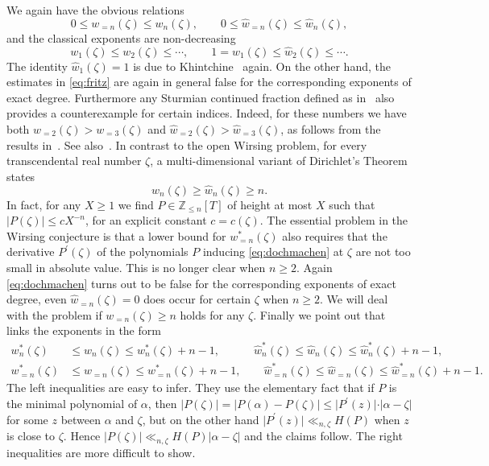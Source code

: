 \documentclass[12pt]{amsart}
\theoremstyle{definition}
\begin{document}
We again have the obvious relations
%
\begin{equation}  \label{eq:obvious}  
0\leq w_{=n}(\zeta)\leq w_{n}(\zeta), \qquad 0\leq \widehat{w}_{=n}(\zeta)\leq \widehat{w}_{n}(\zeta),   
\end{equation}
%
and the classical exponents are non-decreasing
%
\begin{equation} \label{eq:fritz}
w_{1}(\zeta)\leq w_{2}(\zeta)\leq \cdots, \qquad 1=\widehat{w}_{1}(\zeta)\leq \widehat{w}_{2}(\zeta)\leq \cdots.
\end{equation}
%
The identity $\widehat{w}_{1}(\zeta)=1$ is due
to Khintchine~\cite{kinn} again. 
On the other hand, the estimates in \eqref{eq:fritz} are again in general false for 
the corresponding exponents of exact degree.
Furthermore any Sturmian continued fraction defined as in~\cite{buglaur}
also provides a counterexample for certain indices. Indeed, for these 
numbers we have both $w_{=2}(\zeta)>w_{=3}(\zeta)$ 
and $\widehat{w}_{=2}(\zeta)>\widehat{w}_{=3}(\zeta)$, as follows from the results in~\cite{ichstw}.
See also~\cite[Theorem~2.1 and Theorem~2.2]{ichlondon}. In contrast to the open Wirsing problem,
for every transcendental real number $\zeta$, a multi-dimensional
variant of Dirichlet's Theorem states
%
\begin{equation}  \label{eq:dochmachen}
w_{n}(\zeta) \geq \widehat{w}_{n}(\zeta)\geq n.
\end{equation}
%
In fact, for any $X\geq 1$ 
we find $P\in \mathbb{Z}_{\leq n}[T]$ of height 
at most $X$ such that
$\vert P(\zeta)\vert\leq cX^{-n}$, for an explicit constant $c=c(\zeta)$.
The essential problem in the Wirsing conjecture is that a lower
bound for $w_{=n}^{\ast}(\zeta)$ also requires that the
derivative $P^{\prime}(\zeta)$ of the polynomials $P$ 
inducing \eqref{eq:dochmachen} at $\zeta$ are not too small
in absolute value. This is no longer clear when $n\geq 2$.
Again \eqref{eq:dochmachen} turns out to be false for 
the corresponding exponents of exact degree, 
even $\widehat{w}_{=n}(\zeta)=0$
does occur for certain $\zeta$ when $n\geq 2$. 
We will deal with the problem if $w_{=n}(\zeta)\geq n$ holds 
for any $\zeta$.
Finally we point out that ~\cite[Lemma A.8]{bugbuch} links
the exponents in the form
%
\begin{align} 
w_{n}^{\ast}(\zeta)&\leq w_{n}(\zeta)\leq w_{n}^{\ast}(\zeta)+n-1, 
\qquad\quad \widehat{w}_{n}^{\ast}(\zeta)\leq \widehat{w}_{n}(\zeta)\leq \widehat{w}_{n}^{\ast}(\zeta)+n-1,   \label{eq:bbb}  \\
w_{=n}^{\ast}(\zeta)&\leq w_{=n}(\zeta)\leq w_{=n}^{\ast}(\zeta)+n-1, 
\qquad \widehat{w}_{=n}^{\ast}(\zeta)\leq \widehat{w}_{=n}(\zeta)\leq \widehat{w}_{=n}^{\ast}(\zeta)+n-1. \label{eq:allesfa}
\end{align}
%
The left inequalities are easy to infer. They use the elementary 
fact that if $P$ is the minimal polynomial of $\alpha$, then
$\vert P(\zeta)\vert=\vert P(\alpha)-P(\zeta)\vert \leq \vert P^{\prime}(z)\vert\cdot \vert \alpha-\zeta\vert$ for some $z$ between $\alpha$ 
and $\zeta$,
but on the other hand $\vert P^{\prime}(z)\vert\ll_{n,\zeta} H(P)$
when $z$ is close to $\zeta$.
Hence $\vert P(\zeta)\vert
\ll_{n,\zeta} H(P)\vert \alpha-\zeta\vert$ and the claims follow. 
The right inequalities are more difficult to show.
\end{document}
